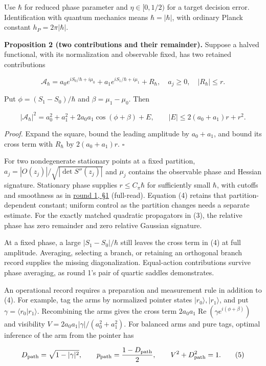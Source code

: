 \documentclass[11pt,a4paper]{article}
\begin{document}
Use \(\hbar\) for reduced phase parameter and \(\eta\in[0,1/2)\) for a
target decision error. Identification with quantum mechanics means
\(\hbar=|\hbar|\), with ordinary Planck constant \(h_P=2\pi|\hbar|\).

\textbf{Proposition 2 (two contributions and their remainder).} Suppose
a halved functional, with its normalization and observable fixed, has
two retained contributions

\[
\mathcal A_\hbar
=a_0e^{iS_0/\hbar+i\mu_0}
+a_1e^{iS_1/\hbar+i\mu_1}+R_\hbar,
\quad a_j\ge0,\quad |R_\hbar|\le r.
\]

Put \(\phi=(S_1-S_0)/\hbar\) and \(\beta=\mu_1-\mu_0\). Then

\[
|\mathcal A_\hbar|^2
=a_0^2+a_1^2+2a_0a_1\cos(\phi+\beta)+E,
\qquad |E|\le2(a_0+a_1)r+r^2.\tag{4}
\]

\emph{Proof.} Expand the square, bound the leading amplitude by
\(a_0+a_1\), and bound its cross term with \(R_\hbar\) by
\(2(a_0+a_1)r\). \(\square\)

For two nondegenerate stationary points at a fixed partition,
\(a_j=|O(z_j)|/\sqrt{|\det S''(z_j)|}\) and \(\mu_j\) contains the
observable phase and Hessian signature. Stationary phase supplies
\(r\le C_\pi\hbar\) for sufficiently small \(\hbar\), with cutoffs and
smoothness as in \href{rivero-1998-conjecture-central-forces.md}{round
1, §1} (full-read). Equation (4) retains that partition-dependent
constant; uniform control as the partition changes needs a separate
estimate. For the exactly matched quadratic propagators in (3), the
relative phase has zero remainder and zero relative Gaussian signature.

At a fixed phase, a large \(|S_1-S_0|/\hbar\) still leaves the cross
term in (4) at full amplitude. Averaging, selecting a branch, or
retaining an orthogonal branch record supplies the missing
diagonalization. Equal-action contributions survive phase averaging, as
round 1's pair of quartic saddles demonstrates.

An operational record requires a preparation and measurement rule in
addition to (4). For example, tag the arms by normalized pointer states
\(|r_0\rangle,|r_1\rangle\), and put \(\gamma=\langle r_0|r_1\rangle\).
Recombining the arms gives the cross term
\(2a_0a_1\operatorname{Re}(\gamma e^{i(\phi+\beta)})\) and visibility
\(V=2a_0a_1|\gamma|/(a_0^2+a_1^2)\). For balanced arms and pure tags,
optimal inference of the arm from the pointer has

\[
D_{\rm path}=\sqrt{1-|\gamma|^2},\qquad
p_{\rm path}=\frac{1-D_{\rm path}}2,\qquad
V^2+D_{\rm path}^2=1.\tag{5}
\]
\end{document}
